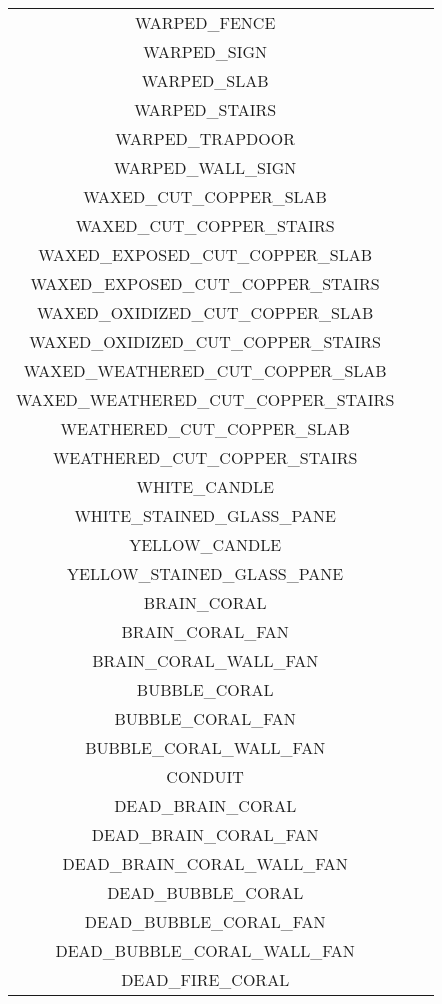 \documentclass[11pt]{article}
\newcommand{\cmark}{\ding{51}}%
\newcommand{\xmark}{\ding{55}}%
\begin{document}
\begin{longtable}{ |c|c|c| }
	WARPED\_FENCE & \xmark \\
	WARPED\_SIGN & \xmark \\
	WARPED\_SLAB & \xmark \\
	WARPED\_STAIRS & \xmark \\
	WARPED\_TRAPDOOR & \xmark \\
	WARPED\_WALL\_SIGN & \xmark \\
	WAXED\_CUT\_COPPER\_SLAB & \xmark \\
	WAXED\_CUT\_COPPER\_STAIRS & \xmark \\
	WAXED\_EXPOSED\_CUT\_COPPER\_SLAB & \xmark \\
	WAXED\_EXPOSED\_CUT\_COPPER\_STAIRS & \xmark \\
	WAXED\_OXIDIZED\_CUT\_COPPER\_SLAB & \xmark \\
	WAXED\_OXIDIZED\_CUT\_COPPER\_STAIRS & \xmark \\
	WAXED\_WEATHERED\_CUT\_COPPER\_SLAB & \xmark \\
	WAXED\_WEATHERED\_CUT\_COPPER\_STAIRS & \xmark \\
	WEATHERED\_CUT\_COPPER\_SLAB & \xmark \\
	WEATHERED\_CUT\_COPPER\_STAIRS & \xmark \\
	WHITE\_CANDLE & \xmark \\
	WHITE\_STAINED\_GLASS\_PANE & \xmark \\
	YELLOW\_CANDLE & \xmark \\
	YELLOW\_STAINED\_GLASS\_PANE & \xmark \\
	\hline
	BRAIN\_CORAL & \cmark \\
	BRAIN\_CORAL\_FAN & \cmark \\
	BRAIN\_CORAL\_WALL\_FAN & \cmark \\
	BUBBLE\_CORAL & \cmark \\
	BUBBLE\_CORAL\_FAN & \cmark \\
	BUBBLE\_CORAL\_WALL\_FAN & \cmark \\
	CONDUIT & \cmark \\
	DEAD\_BRAIN\_CORAL & \cmark \\
	DEAD\_BRAIN\_CORAL\_FAN & \cmark \\
	DEAD\_BRAIN\_CORAL\_WALL\_FAN & \cmark \\
	DEAD\_BUBBLE\_CORAL & \cmark \\
	DEAD\_BUBBLE\_CORAL\_FAN & \cmark \\
	DEAD\_BUBBLE\_CORAL\_WALL\_FAN & \cmark \\
	DEAD\_FIRE\_CORAL & \cmark \\

\end{longtable}
\end{document}
